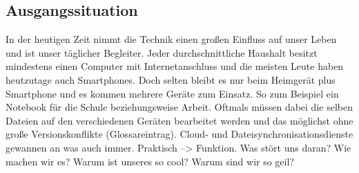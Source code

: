 \subsection{Ausgangssituation}
In der heutigen Zeit nimmt die Technik einen großen Einfluss auf unser Leben und ist unser täglicher Begleiter. Jeder durchschnittliche Haushalt besitzt mindestens einen Computer mit Internetanschluss und die meisten Leute haben heutzutage auch Smartphones. Doch selten bleibt es nur beim Heimgerät plus Smartphone und es kommen mehrere Geräte zum Einsatz. So zum Beispiel ein Notebook für die Schule beziehungsweise Arbeit. Oftmals müssen dabei die selben Dateien auf den verschiedenen Geräten bearbeitet werden und das möglichst ohne große Versionskonflikte (Glossareintrag). 
Cloud- und Dateisynchronisationsdienste gewannen an was auch immer.
Praktisch --> Funktion.
Was stört uns daran?
Wie machen wir es?
Warum ist unseres so cool?
Warum sind wir so geil?
